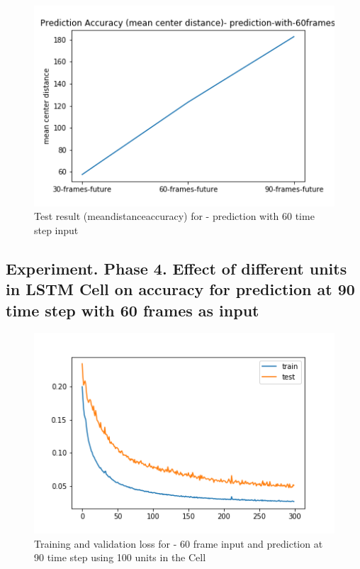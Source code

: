 \begin{figure}[H] \label{60-mcd}
\includegraphics[scale=0.7]{prediction-with-60frames-mean_distance_accuracy}
\begin{center}
\caption{Test result (mean\textunderscore distance\textunderscore accuracy) for - prediction with 60 time step input }
\end{center}
\end{figure}

\subsection{Experiment. Phase 4. Effect of different units in LSTM Cell on accuracy for prediction at 90 time step with 60 frames as input}

\begin{figure}[H] \label{60-90-100unit}
\includegraphics[scale=0.7]{conf14_300e_60_90ffuture_100unit}
\begin{center}
\caption{Training and validation loss for - 60 frame input and prediction at 90 time step using 100 units in the Cell}
\end{center}
\end{figure}



